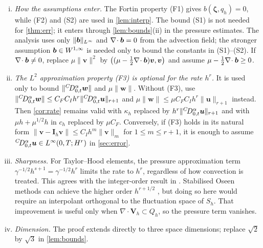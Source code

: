 \begin{remark}\label{rem:hyp}
\begin{enumerate}[(i),leftmargin=2.4em]
\item \emph{How the assumptions enter.} The Fortin property (F1) gives $b(\bm\zeta,q_h)=0$, while (F2) and (S2) are used in \cref{lem:interp}. The bound (S1) is not needed for \cref{thm:err}; it enters through \cref{lem:bounds}(ii) in the pressure estimates. The analysis uses only $\|\boldsymbol b\|_{L^\infty}$ and $\nabla\!\cdot\boldsymbol b=0$ from the advection field; the stronger assumption $\boldsymbol b\in W^{1,\infty}$ is needed only to bound the constants in (S1)--(S2). If $\nabla\!\cdot\boldsymbol b\ne0$, replace $\mu\|\bm v\|^2$ by $\bigl((\mu-\tfrac12\nabla\!\cdot\boldsymbol b)\bm v,\bm v\bigr)$ and assume $\mu-\tfrac12\nabla\!\cdot\boldsymbol b\ge0$.
\item \emph{The $L^2$ approximation property (F3) is optional for the rate $h^r$.} It is used only to bound $\|{}^{C}\!D_{0,t}^{\alpha}\bm w\|$ and $\mu\|\bm w\|$. Without (F3), use $\|{}^{C}\!D_{0,t}^{\alpha}\bm w\|\le C_FC_Ih^r\|{}^{C}\!D_{0,t}^{\alpha}\bm u\|_{r+1}$ and $\mu\|\bm w\|\le\mu C_FC_Ih^r\|\bm u\|_{r+1}$ instead. Then \cref{cor:rate} remains valid with $\kappa_h$ replaced by $h^r\|{}^{C}\!D_{0,t}^{\alpha}\bm u\|_{r+1}$ and with $\mu h+\mu^{1/2}h$ in $c_h$ replaced by $\mu C_F$. Conversely, if (F3) holds in its natural form $\|\bm v-\bm I_h\bm v\|\le C_Ih^m\|\bm v\|_m$ for $1\le m\le r+1$, it is enough to assume ${}^{C}\!D_{0,t}^{\alpha}\bm u\in L^\infty(0,T;H^{r})$ in \eqref{sec:error}.
\item \emph{Sharpness.} For Taylor--Hood elements, the pressure approximation term $\gamma^{-1/2}h^{s+1}=\gamma^{-1/2}h^r$ limits the rate to $h^r$, regardless of how convection is treated. This agrees with the integer-order result in \cite{dFGJN}. Stabilised Oseen methods can achieve the higher order $h^{r+1/2}$ \cite{BF07}, but doing so here would require an interpolant orthogonal to the fluctuation space of $S_h$. That improvement is useful only when $\nabla\!\cdot\bm V_h\subset Q_h$, so the pressure term vanishes.
\item \emph{Dimension.} The proof extends directly to three space dimensions; replace $\sqrt2$ by $\sqrt3$ in \cref{lem:bounds}.
\end{enumerate}
\end{remark}

